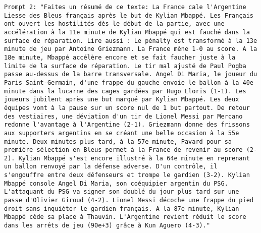 \begin{lstlisting}[label=lst:judge_summar_instances,caption={Example of prompts for paraphrasing in English and French.}]
Prompt 2: "Faites un résumé de ce texte: La France cale l'Argentine Liesse des Bleus français après le but de Kylian Mbappé. Les Français ont ouvert les hostilités dès le début de la partie, avec une accélération à la 11e minute de Kylian Mbappé qui est fauché dans la surface de réparation. Lire aussi : Le pénalty est transformé à la 13e minute de jeu par Antoine Griezmann. La France mène 1-0 au score. A la 18e minute, Mbappé accélère encore et se fait faucher juste à la limite de la surface de réparation. Le tir mal ajusté de Paul Pogba passe au-dessus de la barre transversale. Angel Di Maria, le joueur du Paris Saint-Germain, d'une frappe du gauche envoie le ballon à la 40e minute dans la lucarne des cages gardées par Hugo Lloris (1-1). Les joueurs jubilent après une but marqué par Kylian Mbappé. Les deux équipes vont à la pause sur un score nul de 1 but partout. De retour des vestiaires, une déviation d'un tir de Lionel Messi par Mercano redonne l'avantage à l'Argentine (2-1). Griezmann donne des frissons aux supporters argentins en se créant une belle occasion à la 55e minute. Deux minutes plus tard, à la 57e minute, Pavard pour sa première sélection en Bleus permet à la France de revenir au score (2-2). Kylian Mbappé s'est encore illustré à la 64e minute en reprenant un ballon renvoyé par la défense adverse. D'un contrôle, il s'engouffre entre deux défenseurs et trompe le gardien (3-2). Kylian Mbappé console Angel Di Maria, son coéquipier argentin du PSG. L'attaquant du PSG va signer son doublé du jour plus tard sur une passe d'Olivier Giroud (4-2). Lionel Messi décoche une frappe du pied droit sans inquiéter le gardien français. A la 87e minute, Kylian Mbappé cède sa place à Thauvin. L'Argentine revient réduit le score dans les arrêts de jeu (90e+3) grâce à Kun Aguero (4-3)."

\end{lstlisting}
